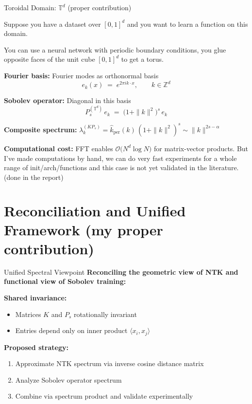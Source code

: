\documentclass{beamer}
\begin{document}
\begin{frame}{Toroidal Domain: $\mathbb{T}^d$ (proper contribution)}

  Suppose you have a dataset over $[0,1]^d$ and you want to learn a function on this domain.

  You can use a neural network with periodic boundary conditions, you glue opposite faces of the unit cube $[0,1]^d$ to get a torus.

\textbf{Fourier basis:} Fourier modes as orthonormal basis
\[
   e_k(x) \;=\; e^{2\pi i k\cdot x}, \qquad k\in\mathbb Z^d
\]

\textbf{Sobolev operator:} Diagonal in this basis
\[
   P_s^{(\mathbb{T}^d)}\,e_k\;=\;\bigl(1+\|k\|^2\bigr)^{s}\,e_k
\]

\textbf{Composite spectrum:} $\lambda_k^{(KP_s)} = \widehat{k}_{\text{per}}(k)\,(1+\|k\|^2)^{s} \sim \|k\|^{2s-\alpha}$

\textbf{Computational cost:} FFT enables $\mathcal O\bigl(N^d\log N\bigr)$ for matrix-vector products.
But I've made computations by hand, we can do very fast experiments for a whole range of init/arch/functions and this case is not yet validated in the literature.
(done in the report)
\end{frame}



\section{Reconciliation and Unified Framework (my proper contribution)}

\begin{frame}{Unified Spectral Viewpoint}
\textbf{Reconciling the geometric view of NTK and functional view of Sobolev training:}

\textbf{Shared invariance:}
\begin{itemize}
\item Matrices $K$ and $P_s$ rotationally invariant
\item Entries depend only on inner product $\langle x_i, x_j \rangle$
\end{itemize}

\textbf{Proposed strategy:}
\begin{enumerate}
\item Approximate NTK spectrum via inverse cosine distance matrix
\item Analyze Sobolev operator spectrum
\item Combine via spectrum product and validate experimentally
\end{enumerate}
\end{frame}
\end{document}
